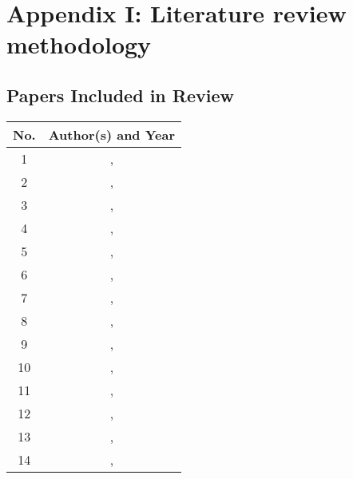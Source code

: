 \chapter{Appendix I: Literature review methodology}

\section{Papers Included in Review}
\label{app_A}

\begin{table}[htbp!]
    \centering
    \begin{tabular}{c|c}
   \hline
  
\textbf{No.}   &   \textbf{Author(s) and Year}    \\
    \hline 
    \hline
1 & \citeauthor{Zhou2016BigInsights}, \citeyear{Zhou2016BigInsights} \\
2 & \citeauthor{Nashawi2010ForecastingModel}, \citeyear{Nashawi2010ForecastingModel} \\
3 & \citeauthor{Galeotti1999RicherCountries}, \citeyear{Galeotti1999RicherCountries} \\
4 & \citeauthor{Hong2014DataBuildings}, \citeyear{Hong2014DataBuildings} \\
5 & \citeauthor{Kontokosta2017ABuildings}, \citeyear{Kontokosta2017ABuildings} \\
6 & \citeauthor{Godwin2013ClassificationAnalysis}, \citeyear{Godwin2013ClassificationAnalysis} \\
7 & \citeauthor{Costanzo2016ExperimentalSystem}, \citeyear{Costanzo2016ExperimentalSystem} \\
8 & \citeauthor{ONeill2016DevelopmentPerformance}, \citeyear{ONeill2016DevelopmentPerformance} \\
9 & \citeauthor{Kontokosta2015ModelingPolicy}, \citeyear{Kontokosta2015ModelingPolicy} \\
10 & \citeauthor{Xu2018AssessingIndustry}, \citeyear{Xu2018AssessingIndustry} \\
11 & \citeauthor{Mbuwir2017BatteryLearning}, \citeyear{Mbuwir2017BatteryLearning} \\
12 & \citeauthor{Bassamzadeh2017MultiscaleNetworks}, \citeyear{Bassamzadeh2017MultiscaleNetworks} \\
13 & \citeauthor{Kazmi2016GeneralizableNZEB}, \citeyear{Kazmi2016GeneralizableNZEB} \\
14 & \citeauthor{Silvapulle2017NonparametricCountries}, \citeyear{Silvapulle2017NonparametricCountries} \\

\end{tabular}
\end{table}
